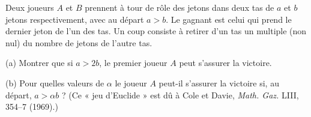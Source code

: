 Deux joueurs $A$ et $B$ prennent à tour de rôle des jetons dans deux tas de $a$ et $b$ jetons respectivement, avec au départ $a > b$. Le gagnant est celui qui prend le dernier jeton de l'un des tas. Un coup consiste à retirer d'un tas un multiple (non nul) du nombre de jetons de l'autre tas.

(a) Montrer que si $a > 2b$, le premier joueur $A$ peut s'assurer la victoire.

(b) Pour quelles valeurs de $\alpha$ le joueur $A$ peut-il s'assurer la victoire si, au départ, $a > \alpha b$ ? (Ce « jeu d'Euclide » est dû à Cole et Davie, \emph{Math. Gaz.} LIII, 354--7 (1969).)
